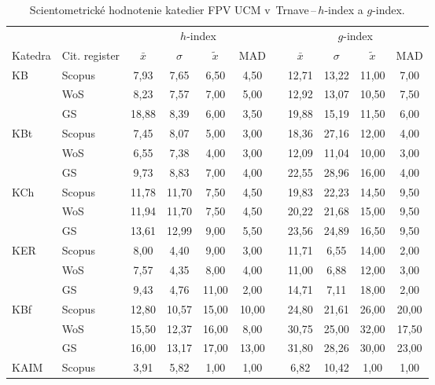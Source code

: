 \begin{table}
  \centering\small
  \caption[Hodnotenie FPV\,--\,$h$-index a $g$-index]%
  {Scientometrické hodnotenie katedier FPV UCM v~Trnave\,--\,$h$-index a $g$-index.}
  \label{tab:3-staff.results}
  \begin{tabularx}{\textwidth}{Xlcccclcccc}
    \toprule
    & & \multicolumn{4}{c}{$h$-index} & & \multicolumn{4}{c}{$g$-index} \\
    \cmidrule{3-6}\cmidrule{8-11}
    Katedra & Cit. register & $\bar{x}$ & $\sigma$ & $\tilde{x}$ & MAD & & $\bar{x}$ & $\sigma$ & $\tilde{x}$ & MAD \\
    \midrule
    KB   & Scopus & 7,93  & 7,65  & 6,50  & 4,50  & & 12,71 & 13,22 & 11,00 & 7,00  \\
         & WoS    & 8,23  & 7,57  & 7,00  & 5,00  & & 12,92 & 13,07 & 10,50 & 7,50  \\
         & GS     & 18,88 & 8,39  & 6,00  & 3,50  & & 19,88 & 15,19 & 11,50 & 6,00  \\[1ex]
    KBt  & Scopus & 7,45  & 8,07  & 5,00  & 3,00  & & 18,36 & 27,16 & 12,00 & 4,00  \\
         & WoS    & 6,55  & 7,38  & 4,00  & 3,00  & & 12,09 & 11,04 & 10,00 & 3,00  \\
         & GS     & 9,73  & 8,83  & 7,00  & 4,00  & & 22,55 & 28,96 & 16,00 & 4,00  \\[1ex]
    KCh  & Scopus & 11,78 & 11,70 & 7,50  & 4,50  & & 19,83 & 22,23 & 14,50 & 9,50  \\
         & WoS    & 11,94 & 11,70 & 7,50  & 4,50  & & 20,22 & 21,68 & 15,00 & 9,50  \\
         & GS     & 13,61 & 12,99 & 9,00  & 5,50  & & 23,56 & 24,89 & 16,50 & 9,50  \\[1ex]
    KER  & Scopus & 8,00  & 4,40  & 9,00  & 3,00  & & 11,71 & 6,55  & 14,00 & 2,00  \\
         & WoS    & 7,57  & 4,35  & 8,00  & 4,00  & & 11,00 & 6,88  & 12,00 & 3,00  \\
         & GS     & 9,43  & 4,76  & 11,00 & 2,00  & & 14,71 & 7,11  & 18,00 & 2,00  \\[1ex]
    KBf  & Scopus & 12,80 & 10,57 & 15,00 & 10,00 & & 24,80 & 21,61 & 26,00 & 20,00 \\
         & WoS    & 15,50 & 12,37 & 16,00 & 8,00  & & 30,75 & 25,00 & 32,00 & 17,50 \\
         & GS     & 16,00 & 13,17 & 17,00 & 13,00 & & 31,80 & 28,26 & 30,00 & 23,00 \\[1ex]
    KAIM & Scopus & 3,91  & 5,82  & 1,00  & 1,00  & & 6,82  & 10,42 & 1,00  & 1,00  \\

\end{tabularx}
\end{table}
